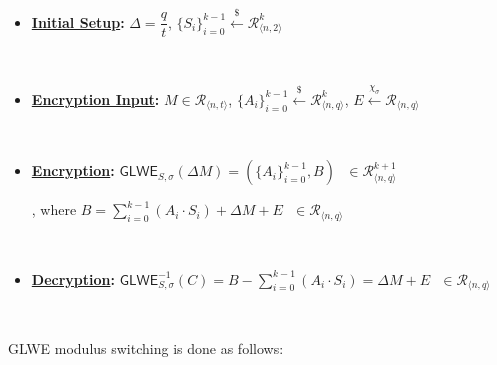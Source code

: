 \begin{itemize}
\item \textbf{\underline{Initial Setup}: } $\Delta = \dfrac{q}{t}$, \text{ } $\{S_i\}_{i=0}^{k-1} \xleftarrow{\$} \mathcal{R}_{\langle n, 2 \rangle}^k$

$ $

\item \textbf{\underline{Encryption Input}: } $M \in \mathcal{R}_{\langle n, t \rangle}$, \text{ } $\{A_i\}_{i=0}^{k-1} \xleftarrow{\$} \mathcal{R}_{\langle n,q \rangle}^{k}$, \text{ } $E \xleftarrow{\chi_\sigma} \mathcal{R}_{\langle n,q \rangle}$

$ $

\item \textbf{\underline{Encryption}: } $\textsf{GLWE}_{S,\sigma}(\Delta M) = (\{A_i\}_{i=0}^{k-1}, B) \text{ } \in \mathcal{R}_{\langle n,q \rangle}^{k + 1}$ 

, where $B = \sum\limits_{i=0}^{k-1}{(A_i \cdot S_i)} + \Delta  M + E \text{ } \in \mathcal{R}_{\langle n,q \rangle}$

$ $

\item \textbf{\underline{Decryption}: } $\textsf{GLWE}^{-1}_{S,\sigma}(C) = B - \sum\limits_{i=0}^{k-1}{(A_i \cdot S_i)} = \Delta  M + E \text{ } \in \mathcal{R}_{\langle n,q \rangle}$

\end{itemize}

$ $

GLWE modulus switching is done as follows:

